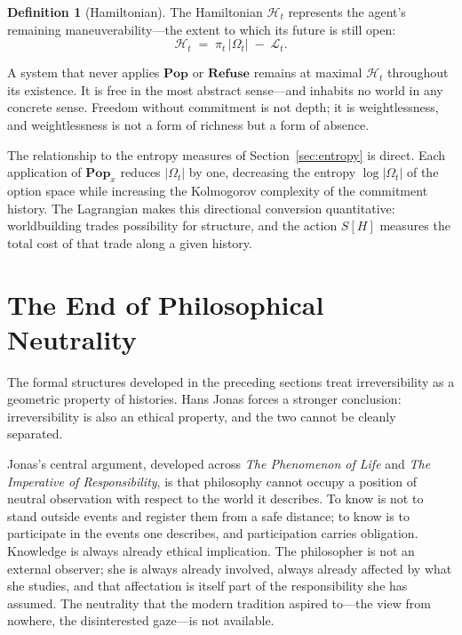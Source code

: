 \documentclass[12pt]{article}
\theoremstyle{plain}
\theoremstyle{definition}
\newtheorem{definition}[theorem]{Definition}
\theoremstyle{remark}
\newcommand{\Pop}{\mathbf{Pop}}
\newcommand{\Refuse}{\mathbf{Refuse}}
\newcommand{\picommit}{\pi}
\newcommand{\Lagrangian}{\mathcal{L}}
\begin{document}
\begin{definition}[Hamiltonian]
The Hamiltonian $\mathcal{H}_t$ represents the agent's remaining
maneuverability---the extent to which its future is still open:
\[
  \mathcal{H}_t \;=\; \picommit_t \,|\Omega_t| \;-\; \Lagrangian_t.
\]
\end{definition}

A system that never applies $\Pop$ or $\Refuse$ remains at maximal
$\mathcal{H}_t$ throughout its existence.  It is free in the most abstract
sense---and inhabits no world in any concrete sense.  Freedom without commitment
is not depth; it is weightlessness, and weightlessness is not a form of richness
but a form of absence.

The relationship to the entropy measures of Section~\ref{sec:entropy} is direct.
Each application of $\Pop_x$ reduces $|\Omega_t|$ by one, decreasing the
entropy $\log|\Omega_t|$ of the option space while increasing the Kolmogorov
complexity of the commitment history.  The Lagrangian makes this directional
conversion quantitative: worldbuilding trades possibility for structure, and the
action $S[H]$ measures the total cost of that trade along a given history.


\section{The End of Philosophical Neutrality}
\label{sec:ethics}

The formal structures developed in the preceding sections treat irreversibility
as a geometric property of histories.  Hans Jonas forces a stronger conclusion:
irreversibility is also an ethical property, and the two cannot be cleanly
separated.

Jonas's central argument, developed across \textit{The Phenomenon of Life} and
\textit{The Imperative of Responsibility}, is that philosophy cannot occupy a
position of neutral observation with respect to the world it describes.  To know
is not to stand outside events and register them from a safe distance; to know
is to participate in the events one describes, and participation carries
obligation.  Knowledge is always already ethical implication.  The philosopher
is not an external observer; she is always already involved, always already
affected by what she studies, and that affectation is itself part of the
responsibility she has assumed.  The neutrality that the modern tradition aspired
to---the view from nowhere, the disinterested gaze---is not available.
\end{document}
